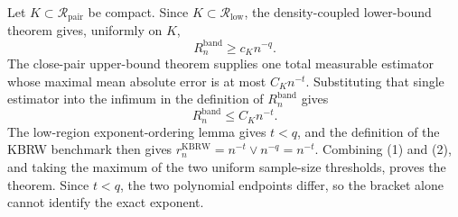 Let \(K\subset\mathcal R_{\mathrm{pair}}\) be compact.  Since
\(K\subset\mathcal R_{\mathrm{low}}\), the density-coupled lower-bound theorem
gives, uniformly on \(K\),
\[
R_n^{\mathrm{band}}\geq c_K n^{-q}.
\tag{1}
\]
The close-pair upper-bound theorem supplies one total measurable estimator
whose maximal mean absolute error is at most \(C_Kn^{-t}\).  Substituting
that single estimator into the infimum in the definition of
\(R_n^{\mathrm{band}}\) gives
\[
R_n^{\mathrm{band}}\leq C_Kn^{-t}.
\tag{2}
\]
The low-region exponent-ordering lemma gives \(t<q\), and the definition of
the KBRW benchmark then gives
\(r_n^{\mathrm{KBRW}}=n^{-t}\vee n^{-q}=n^{-t}\).  Combining (1) and
(2), and taking the maximum of the two uniform sample-size thresholds, proves
the theorem.  Since \(t<q\), the two polynomial endpoints differ, so the
bracket alone cannot identify the exact exponent.